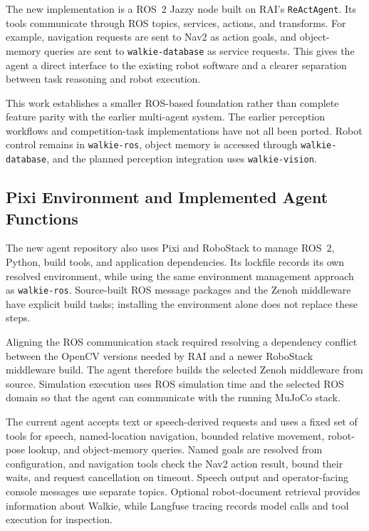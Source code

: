\documentclass[12pt,a4paper]{article}
\begin{document}
The new implementation is a ROS~2 Jazzy node built on RAI's
\texttt{ReActAgent}. Its tools communicate through ROS topics,
services, actions, and transforms. For example, navigation requests
are sent to Nav2 as action goals, and object-memory queries are sent
to \texttt{walkie-database} as service requests. This gives the agent
a direct interface to the existing robot software and a clearer
separation between task reasoning and robot execution.

This work establishes a smaller ROS-based foundation rather than
complete feature parity with the earlier multi-agent system.
The earlier perception workflows and competition-task implementations
have not all been ported. Robot control remains in
\texttt{walkie-ros}, object memory is accessed through
\texttt{walkie-database}, and the planned perception integration uses
\texttt{walkie-vision}.

\subsection*{Pixi Environment and Implemented Agent Functions}

The new agent repository also uses Pixi and RoboStack to manage
ROS~2, Python, build tools, and application dependencies. Its lockfile
records its own resolved environment, while using the same environment
management approach as \texttt{walkie-ros}. Source-built ROS message
packages and the Zenoh middleware have explicit build tasks; installing
the environment alone does not replace these steps.

Aligning the ROS communication stack required resolving a dependency
conflict between the OpenCV versions needed by RAI and a newer
RoboStack middleware build. The agent therefore builds the selected
Zenoh middleware from source. Simulation execution uses ROS simulation
time and the selected ROS domain so that the agent can communicate
with the running MuJoCo stack.

The current agent accepts text or speech-derived requests and uses a
fixed set of tools for speech, named-location navigation, bounded
relative movement, robot-pose lookup, and object-memory queries.
Named goals are resolved from configuration, and navigation tools
check the Nav2 action result, bound their waits, and request
cancellation on timeout. Speech output and operator-facing console
messages use separate topics. Optional robot-document retrieval
provides information about Walkie, while Langfuse tracing records
model calls and tool execution for inspection.
\end{document}
